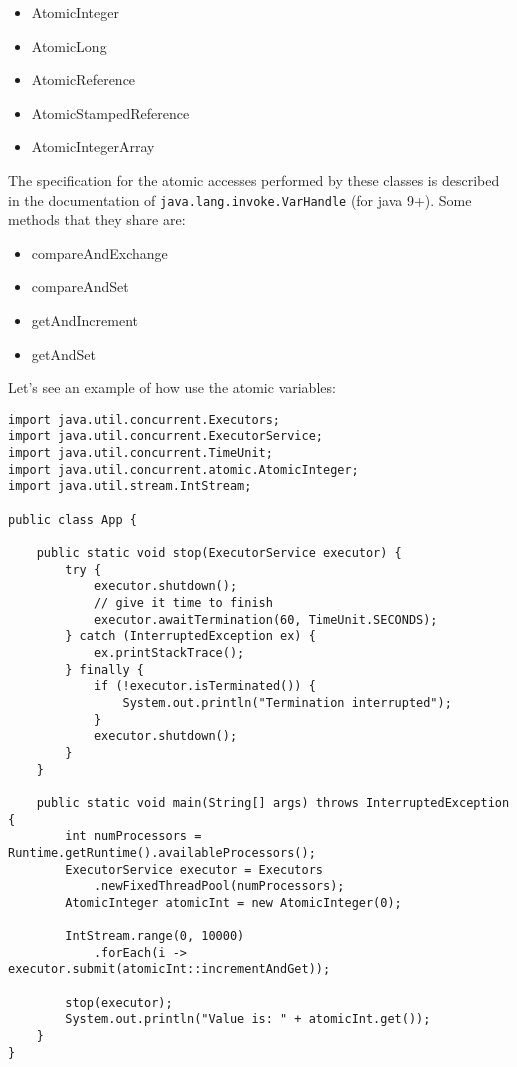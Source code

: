 \documentclass{latex/classes/myarticle}
\begin{document}
\begin{itemize}
\item AtomicInteger
\item AtomicLong
\item AtomicReference
\item AtomicStampedReference
\item AtomicIntegerArray
\end{itemize}

The specification for the atomic accesses performed by these classes is
described in the documentation of \texttt{java.lang.invoke.VarHandle} (for java
9+). Some methods that they share are:

\begin{itemize}
\item compareAndExchange
\item compareAndSet
\item getAndIncrement
\item getAndSet
\end{itemize}

Let's see an example of how use the atomic variables:

\begin{lstlisting}
import java.util.concurrent.Executors;
import java.util.concurrent.ExecutorService;
import java.util.concurrent.TimeUnit;
import java.util.concurrent.atomic.AtomicInteger;
import java.util.stream.IntStream;

public class App {

    public static void stop(ExecutorService executor) {
        try {
            executor.shutdown();
            // give it time to finish
            executor.awaitTermination(60, TimeUnit.SECONDS);
        } catch (InterruptedException ex) {
            ex.printStackTrace();
        } finally {
            if (!executor.isTerminated()) {
                System.out.println("Termination interrupted");
            }
            executor.shutdown();
        }
    }

    public static void main(String[] args) throws InterruptedException {
        int numProcessors = Runtime.getRuntime().availableProcessors();
        ExecutorService executor = Executors
            .newFixedThreadPool(numProcessors);
        AtomicInteger atomicInt = new AtomicInteger(0);

        IntStream.range(0, 10000)
            .forEach(i -> executor.submit(atomicInt::incrementAndGet));

        stop(executor);
        System.out.println("Value is: " + atomicInt.get());
    }
}
\end{lstlisting}
\end{document}
